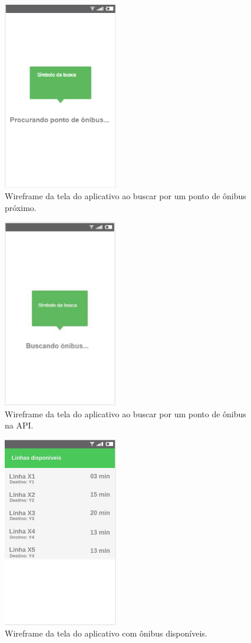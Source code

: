 \documentclass[
	12pt,				%
	oneside,			%
	a4paper,			%
	brazil				%
]{abntex2}
\begin{document}
\begin{apendicesenv}
\begin{figure}[H]
\centering
\includegraphics[width=5cm, center]{images/tela-1-buscando-beacon.PNG}
\caption{Wireframe da tela do aplicativo ao buscar por um ponto de ônibus próximo.}
\label{Rotulo}
\end{figure}

\begin{figure}[H]
\centering
\includegraphics[width=5cm, center]{images/tela-2-buscando-ponto.PNG}
\caption{Wireframe da tela do aplicativo ao buscar por um ponto de ônibus na API.}
\label{Rotulo}
\end{figure}

\begin{figure}[H]
\centering
\includegraphics[width=5cm, center]{images/tela-3-lista-de-onibus.PNG}
\caption{Wireframe da tela do aplicativo com ônibus disponíveis.}
\label{Rotulo}
\end{figure}


\end{apendicesenv}
\end{document}
